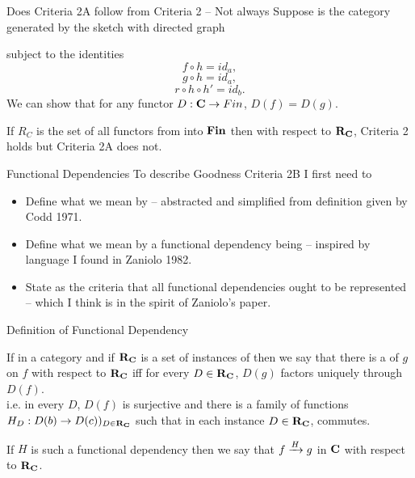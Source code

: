 \begin{frame}{Does Criteria 2A follow from Criteria 2 -- Not always}
Suppose \catcw is the category generated by the sketch with directed graph

subject to the identities
\begin{equation}
\label{fhidentity}
f \circ h = id_a,
\end{equation}
\begin{equation}
\label{ghidentity}
g \circ h = id_a,
\end{equation}
\begin{equation}
\label{rhhpidentity}
r \circ h \circ h' = id_b.
\end{equation}
We can show that for any functor $D:\catc \morph Fin$, $D(f)=D(g)$. 

If $R_C$ is the set of all functors from \catcw into $\Fin$ then with respect to $\reqtc$, Criteria 2 holds but Criteria 2A does not.
\end{frame}

\begin{frame}{Functional Dependencies}
To describe Goodness Criteria 2B I first need to
\begin{itemize}
\item Define what we mean by 
-- abstracted and simplified from definition given by Codd 1971.
\item Define what we mean by a functional dependency being 
-- inspired by language I found in Zaniolo 1982.
\item State as the criteria that all functional dependencies ought to be represented -- which I think is in
the spirit of Zaniolo's paper. 
\end{itemize}
\end{frame}

\begin{frame}{Definition of Functional Dependency}
\begin{definition}
If \scalebox{0.9}{\fgsourcediagram} in a category \catcw  and if $\reqtc$ is a set of instances of \catcw
then we say that there is a   of $g$ on $f$ with respect to $\reqtc$ iff
for every $D \in \reqtc$, $D(g)$ factors uniquely through $D(f)$. \\
\pause \medskip
i.e.  in every $D$, $D(f)$ is surjective and there is a family of  functions $H_D:D(b) \morph D(c))_{D \in \reqtc}$
such that in each instance $D \in \reqtc$,
 commutes.
\end{definition}

\pause If $H$ is such a functional dependency then we say that $\fundep{H}{f}{g}$ in $\catc$ with respect to $\reqtc$.
\end{frame}

